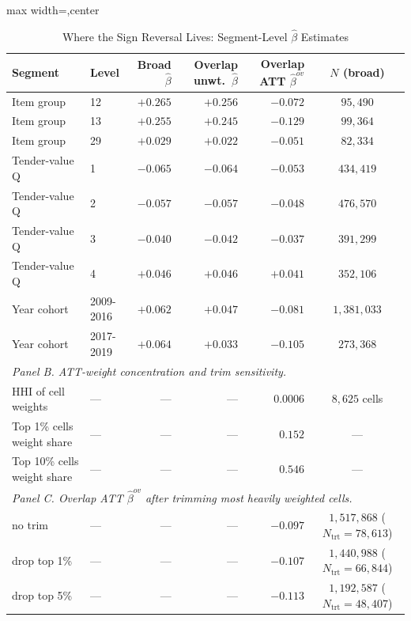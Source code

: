 \begin{table}[htbp]
\centering
\caption{Where the Sign Reversal Lives: Segment-Level $\widehat\beta$ Estimates}
\label{tab:sign_reversal_segment}
\begin{adjustbox}{max width=\textwidth,center}
\begin{threeparttable}
\footnotesize
\begin{tabular}{llrrr c}
\toprule
Segment & Level & Broad $\widehat\beta$ & Overlap unwt.\ $\widehat\beta$ & Overlap ATT $\widehat\beta^{ov}$ & $N$ (broad) \\
\midrule
Item group & 12 & $+0.265$ & $+0.256$ & $-0.072$ & $95{,}490$ \\
Item group & 13 & $+0.255$ & $+0.245$ & $-0.129$ & $99{,}364$ \\
Item group & 29 & $+0.029$ & $+0.022$ & $-0.051$ & $82{,}334$ \\
Tender-value Q & 1 & $-0.065$ & $-0.064$ & $-0.053$ & $434{,}419$ \\
Tender-value Q & 2 & $-0.057$ & $-0.057$ & $-0.048$ & $476{,}570$ \\
Tender-value Q & 3 & $-0.040$ & $-0.042$ & $-0.037$ & $391{,}299$ \\
Tender-value Q & 4 & $+0.046$ & $+0.046$ & $+0.041$ & $352{,}106$ \\
Year cohort & 2009-2016 & $+0.062$ & $+0.047$ & $-0.081$ & $1{,}381{,}033$ \\
Year cohort & 2017-2019 & $+0.064$ & $+0.033$ & $-0.105$ & $273{,}368$ \\
\midrule
\multicolumn{6}{l}{\textit{Panel B. ATT-weight concentration and trim sensitivity.}} \\
HHI of cell weights & --- & --- & --- & $0.0006$ & $8{,}625$ cells \\
Top 1\% cells weight share & --- & --- & --- & $0.152$ & --- \\
Top 10\% cells weight share & --- & --- & --- & $0.546$ & --- \\
\midrule
\multicolumn{6}{l}{\textit{Panel C. Overlap ATT $\widehat\beta^{ov}$ after trimming most heavily weighted cells.}} \\
no trim & --- & --- & --- & $-0.097$ & $1{,}517{,}868$ ($N_{\text{trt}}=78{,}613$) \\
drop top 1\% & --- & --- & --- & $-0.107$ & $1{,}440{,}988$ ($N_{\text{trt}}=66{,}844$) \\
drop top 5\% & --- & --- & --- & $-0.113$ & $1{,}192{,}587$ ($N_{\text{trt}}=48{,}407$) \\

\end{tabular}
\end{threeparttable}
\end{adjustbox}
\end{table}

